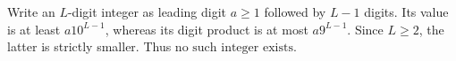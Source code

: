 Write an $L$-digit integer as leading digit $a\ge1$ followed by $L-1$ digits. Its value is at least $a10^{L-1}$, whereas its digit product is at most $a9^{L-1}$. Since $L\ge2$, the latter is strictly smaller. Thus $\boxed{\text{no such integer exists}}$.
